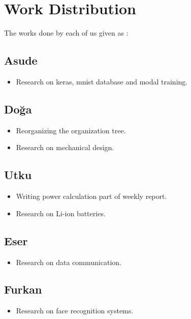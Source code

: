 \section{Work Distribution}
\label{sec:workDistribution}
The works done by each of us given as :
\subsection{Asude}
\begin{itemize}
    \item Research on keras, mnist database and modal training.
\end{itemize}

\subsection{Doğa}
\begin{itemize}
    \item Reorganizing the organization tree.
\item  Research on mechanical design.
\end{itemize}


\subsection{Utku}
\begin{itemize}
    \item Writing power calculation part of weekly report.
    \item Research on Li-ion batteries.
\end{itemize}


\subsection{Eser}
\begin{itemize}
    \item Research on data communication.
\end{itemize}


\subsection{Furkan}
\begin{itemize}
    \item Research on face recognition systems.
\end{itemize}

